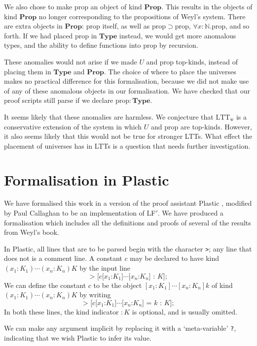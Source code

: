 \documentclass[acmtocl]{acmtrans2m}
\newcommand{\LTTW}{\ensuremath{\mathrm{LTT}_\mathrm{w}}}
\newcommand{\Type}{\mathbf{Type}}
\newcommand{\Prop}{\mathbf{Prop}}
\newcommand{\p}{\mathrm{prop}}
\begin{document}
We also chose to make $\p$ an object of kind $\Prop$.  This results in the objects of kind $\Prop$ no longer corresponding to the propositions of Weyl's system.  There are extra objects in $\Prop$: $\p$ itself, as well as $\p \supset \p$, $\forall x : \mathbb{N}. \p$, and so forth.  If we had placed $\p$ in $\Type$ instead, we would get more anomalous types, and the ability to define functions into $\p$ by recursion.

These anomalies would not arise if we made $U$ and $\p$ top-kinds, instead of placing them in $\Type$ and $\Prop$.
The choice of where to place the universes makes no practical difference for this formalisation, because we did not make use of any of these anomalous objects in our formalisation.  We have checked that our proof scripts still parse if we declare $\p : \Type$.

It seems likely that these anomalies are harmless.  We conjecture that $\LTTW$ is a conservative extension of the system in which $U$ and $\p$ are top-kinds.  However, it also seems likely that this would not be true for stronger LTTs.  What effect the placement of universes has in LTTs is a question that needs further investigation.

\section{Formalisation in Plastic}
\label{section:formal}

We have formalised this work in a version of the proof assistant
Plastic \cite{plastic}, modified by Paul Callaghan to be an
implementation of LF$'$.  We have produced a formalisation which
includes all the definitions and proofs of several of the results
from Weyl's book.

In Plastic, all lines that are to be parsed begin with the character
\texttt{>}; any line that does not is a comment line.  A constant
$c$ may be declared to have kind $(x_1 : K_1) \cdots (x_n : K_n) K$
by the input line
\[ \texttt{> [} c \texttt{[} x_1 \texttt{:} K_1 \texttt{]} \cdots \texttt{[} x_n \texttt{:} K_n \texttt{] : } K \texttt{];} \]
We can define the constant $c$ to be the object $[x_1 : K_1] \cdots
[x_n : K_n] k$ of kind $(x_1 : K_1) \cdots (x_n : K_n) K$ by writing
\[ \texttt{> [} c \texttt{[} x_1 \texttt{:} K_1 \texttt{]} \cdots \texttt{[} x_n \texttt{:} K_n \texttt{] = } k \texttt{ : } K \texttt{];} \]
In both these lines, the kind indicator $\mathtt{:} K$ is optional, and is usually omitted.

We can make any argument implicit by replacing it with a `meta-variable' \texttt{?},
indicating that we wish Plastic to infer its value.
\end{document}
